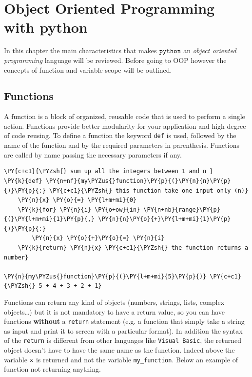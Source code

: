 \chapter{Object Oriented Programming with python}\label{introduction-to-python---lesson-2}

In this chapter the main characteristics that makes $\tt{python}$ an \textit{object oriented programming} language will be reviewed.
Before going to OOP however the concepts of function and variable scope will be outlined.

\section{Functions}\label{functions}

A function is a block of organized, reusable code that is used to perform a single action. Functions provide better modularity for your application and high degree of code reusing.
To define a function the keyword \texttt{def} is used, followed by the name of the function and by the required parameters in parenthesis. Functions are called by name passing the necessary parameters if any.

\begin{tcolorbox}[breakable, size=fbox, boxrule=1pt, pad at break*=1mm,colback=cellbackground, colframe=cellborder]
\begin{Verbatim}[commandchars=\\\{\}]
\PY{c+c1}{\PYZsh{} sum up all the integers between 1 and n }
\PY{k}{def} \PY{n+nf}{my\PYZus{}function}\PY{p}{(}\PY{n}{n}\PY{p}{)}\PY{p}{:} \PY{c+c1}{\PYZsh{} this function take one input only (n)}
    \PY{n}{x} \PY{o}{=} \PY{l+m+mi}{0}
    \PY{k}{for} \PY{n}{i} \PY{o+ow}{in} \PY{n+nb}{range}\PY{p}{(}\PY{l+m+mi}{1}\PY{p}{,} \PY{n}{n}\PY{o}{+}\PY{l+m+mi}{1}\PY{p}{)}\PY{p}{:}
        \PY{n}{x} \PY{o}{+}\PY{o}{=} \PY{n}{i}
    \PY{k}{return} \PY{n}{x} \PY{c+c1}{\PYZsh{} the function returns a number}

\PY{n}{my\PYZus{}function}\PY{p}{(}\PY{l+m+mi}{5}\PY{p}{)} \PY{c+c1}{\PYZsh{} 5 + 4 + 3 + 2 + 1}
\end{Verbatim}
\end{tcolorbox}

Functions can return any kind of objects (numbers, strings, lists, complex objects\ldots{}) but it is not mandatory to have a return value, so you can have functions \textbf{without} a \texttt{return} statement (e.g. a function that simply take a string as input and print it to screen with a particular format).
In addition the syntax of the \texttt{return} is different from other languages like \texttt{Visual\ Basic}, the returned object doesn't have to have the same name as the function. Indeed above the variable $\tt{x}$ is returned and not the variable \texttt{my\_function}. Below an example of function not returning anything.

